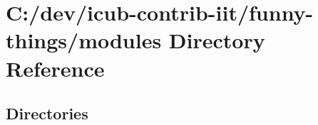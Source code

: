 \section{C\+:/dev/icub-\/contrib-\/iit/funny-\/things/modules Directory Reference}
\label{dir_e05d7e2b1ecd646af5bb94391405f3b5}
\subsection*{Directories}
\begin{DoxyCompactItemize}
\end{DoxyCompactItemize}
